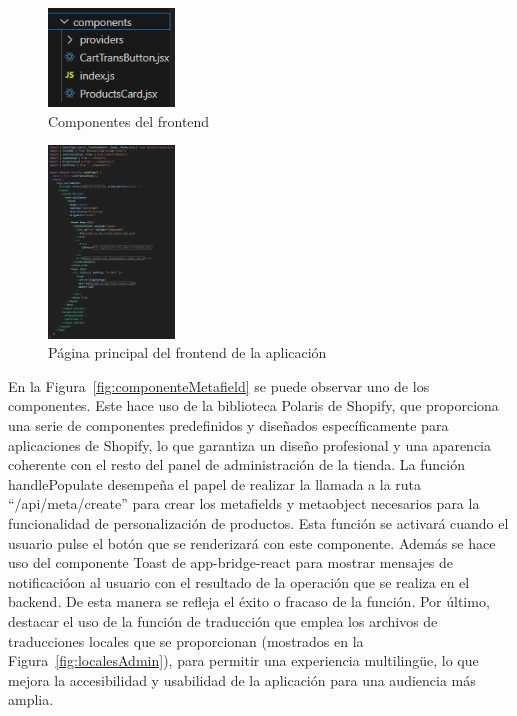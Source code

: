\documentclass[12pt]{article}
\begin{document}
\begin{figure}[ht]
    \centering
    \includegraphics[width=0.3\textwidth]{imagenes-admin/componentes-admin.png}
    \caption{\label{fig:componentes} Componentes del frontend }
    \vspace{\fill}
\end{figure}



\begin{figure}[ht]
    \centering
    \includegraphics[width=0.3\textwidth]{imagenes-admin/paginaHome.png}
    \caption{\label{fig:homepage} Página principal del frontend de la aplicación }
    \vspace{\fill}
\end{figure}

En la Figura~\ref{fig:componenteMetafield} se puede observar uno de los componentes. Este hace uso de la biblioteca Polaris de Shopify, que proporciona una serie de componentes predefinidos
y diseñados específicamente para aplicaciones de Shopify, lo que garantiza un diseño profesional y una aparencia coherente con el resto del panel de administración de la tienda.
La función handlePopulate desempeña el papel de realizar la llamada a la ruta ``/api/meta/create'' para crear los metafields y metaobject necesarios para la funcionalidad de personalización de productos.
Esta función se activará cuando el usuario pulse el botón que se renderizará con este componente. Además se hace uso del componente Toast de app-bridge-react para mostrar
mensajes de notificacióon al usuario con el resultado de la operación que se realiza en el backend. De esta manera se refleja el éxito o fracaso de la función. Por último, destacar el uso de la función
de traducción que emplea los archivos de traducciones locales que se proporcionan (mostrados en la Figura~\ref{fig:localesAdmin}), para permitir una experiencia multilingüe, lo que mejora
la accesibilidad y usabilidad de la aplicación para una audiencia más amplia.
\end{document}
